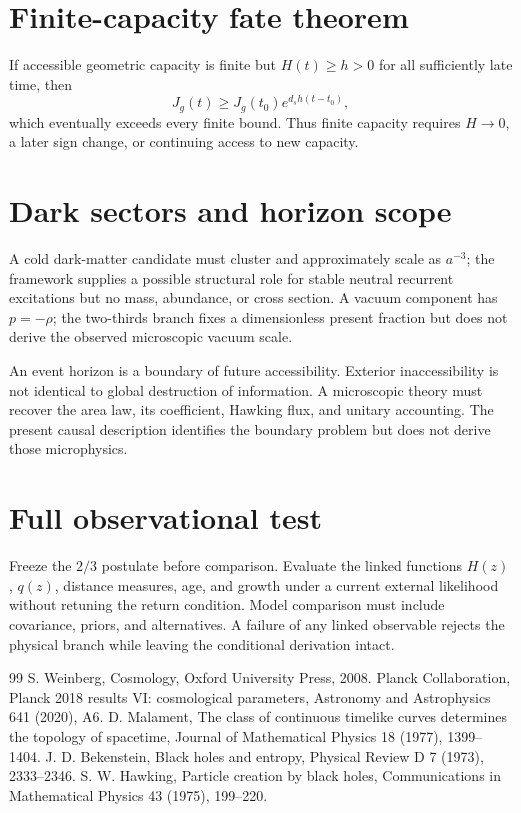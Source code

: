 \documentclass[11pt,a4paper]{article}
\begin{document}
\section{Finite-capacity fate theorem}
If accessible geometric capacity is finite but $H(t)\ge h>0$ for all sufficiently late time, then
\begin{equation}
J_g(t)\ge J_g(t_0)e^{d_sh(t-t_0)},
\end{equation}
which eventually exceeds every finite bound. Thus finite capacity requires $H\to0$, a later sign change, or continuing access to new capacity.

\section{Dark sectors and horizon scope}
A cold dark-matter candidate must cluster and approximately scale as $a^{-3}$; the framework supplies a possible structural role for stable neutral recurrent excitations but no mass, abundance, or cross section. A vacuum component has $p=-\rho$; the two-thirds branch fixes a dimensionless present fraction but does not derive the observed microscopic vacuum scale.

An event horizon is a boundary of future accessibility. Exterior inaccessibility is not identical to global destruction of information. A microscopic theory must recover the area law, its coefficient, Hawking flux, and unitary accounting. The present causal description identifies the boundary problem but does not derive those microphysics.

\section{Full observational test}
Freeze the $2/3$ postulate before comparison. Evaluate the linked functions $H(z)$, $q(z)$, distance measures, age, and growth under a current external likelihood without retuning the return condition. Model comparison must include covariance, priors, and alternatives. A failure of any linked observable rejects the physical branch while leaving the conditional derivation intact.

\begin{thebibliography}{99}
 S. Weinberg, Cosmology, Oxford University Press, 2008.
 Planck Collaboration, Planck 2018 results VI: cosmological parameters, Astronomy and Astrophysics 641 (2020), A6.
 D. Malament, The class of continuous timelike curves determines the topology of spacetime, Journal of Mathematical Physics 18 (1977), 1399--1404.
 J. D. Bekenstein, Black holes and entropy, Physical Review D 7 (1973), 2333--2346.
 S. W. Hawking, Particle creation by black holes, Communications in Mathematical Physics 43 (1975), 199--220.
\end{thebibliography}
\end{document}
